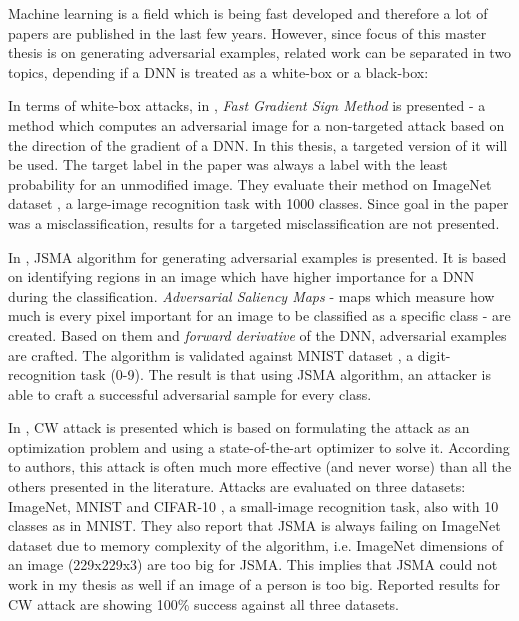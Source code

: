 Machine learning is a field which is being fast developed and therefore a lot of papers are published in the last few years. However, since focus of this master thesis is on generating adversarial examples, related work can be separated in two topics, depending if a DNN is treated as a white-box or a black-box:

In terms of white-box attacks, in \cite{fgsm-original}, \textit{Fast Gradient Sign Method} is presented - a method which computes an adversarial image for a non-targeted attack based on the direction of the gradient of a DNN. In this thesis, a targeted version \cite{fgsm-targeted} of it will be used. The target label in the paper was always a label with the least probability for an unmodified image. They evaluate their method on ImageNet dataset \cite{datasetImageNet}, a large-image recognition task with 1000 classes. Since goal in the paper was a misclassification, results for a targeted misclassification are not presented. 

In \cite{DBLP:journals/corr/PapernotMJFCS15}, JSMA algorithm for generating adversarial examples is presented. It is based on identifying regions in an image which have higher importance for a DNN during the classification. \textit{Adversarial Saliency Maps} - maps which measure how much is every pixel important for an image to be classified as a specific class - are created. Based on them and \textit{forward derivative} of the DNN, adversarial examples are crafted. The algorithm is validated against MNIST dataset \cite{datasetMNIST}, a digit-recognition task (0-9). The result is that using JSMA algorithm, an attacker is able to craft a successful adversarial sample for every class.

In \cite{DBLP:journals/corr/CarliniW16a}, CW attack is presented which is based on formulating the attack as an optimization problem and using a state-of-the-art optimizer to solve it. According to authors, this attack is often much more effective (and never worse) than all the others presented in the literature. 
Attacks are evaluated on three datasets: ImageNet, MNIST and CIFAR-10 \cite{datasetCIFAR10}, a small-image recognition task, also with 10 classes as in MNIST. They also report that JSMA is always failing on ImageNet dataset due to memory complexity of the algorithm, i.e. ImageNet dimensions of an image (229x229x3) are too big for JSMA. This implies that JSMA could not work in my thesis as well if an image of a person is too big. Reported results for CW attack are showing 100\% success against all three datasets.

